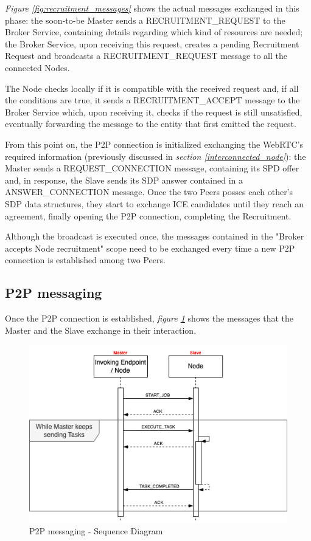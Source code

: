 \textit{Figure \ref{fig:recruitment_messages}} shows the actual messages exchanged in this phase: the soon-to-be Master sends a RECRUITMENT\_REQUEST to the Broker Service, containing details regarding which kind of resources are needed; the Broker Service, upon receiving this request, creates a pending Recruitment Request and broadcasts a RECRUITMENT\_REQUEST message to all the connected Nodes.

The Node checks locally if it is compatible with the received request and, if all the conditions are true, it sends a RECRUITMENT\_ACCEPT message to the Broker Service which, upon receiving it, checks if the request is still unsatisfied, eventually forwarding the message to the entity that first emitted the request.

From this point on, the P2P connection is initialized exchanging the WebRTC's required information (previously discussed in \textit{section \ref{interconnected_node}}): the Master sends a REQUEST\_CONNECTION message, containing its SPD offer and, in response, the Slave sends its SDP answer contained in a ANSWER\_CONNECTION message. Once the two Peers posses each other's SDP data structures, they start to exchange ICE candidates until they reach an agreement, finally opening the P2P connection, completing the Recruitment.

Although the broadcast is executed once, the messages contained in the "Broker accepts Node recruitment" scope need to be exchanged every time a new P2P connection is established among two Peers.

\subsection{P2P messaging}
Once the P2P connection is established, \textit{figure \ref{fig:p2p_messages}} shows the messages that the Master and the Slave exchange in their interaction.

\begin{figure}[!ht]
    \centering
    \includegraphics[scale=0.65]{document/chapters/chapter_7/images/p2p_messages.png}
    \caption{P2P messaging - Sequence Diagram}
    \label{fig:p2p_messages}
\end{figure}

